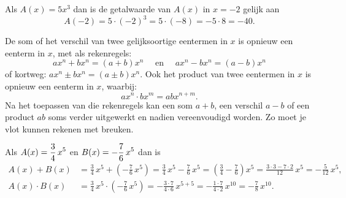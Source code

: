 \documentclass{ximera}
\begin{document}
\begin{example} 
Als $A(x) = 5x^3$ dan is de getalwaarde van $A(x)$ in $x = -2$ gelijk aan 
\[
A(-2) = 5 \cdot (-2)^3 = 5 \cdot (-8) = - 5 \cdot 8 = -40.
\]
\end{example} 

De som of het verschil van twee gelijksoortige eentermen in $x$ is opnieuw een eenterm in $x$, met als rekenregels:
\[
ax^n + bx^n = (a+b)x^n \quad \text{ en } \quad ax^n - bx^n = (a-b)x^n
\]
of kortweg: $ax^n \pm bx^n = (a\pm b)x^n$. Ook het product van twee eentermen in $x$ is opnieuw een eenterm in $x$, waarbij:
\[
ax^n \cdot bx^m = abx^{n+m}.
\]
Na het toepassen van die rekenregels kan een som $a+b$, een verschil $a-b$ of een product $ab$ soms verder uitgewerkt en nadien vereenvoudigd worden. Zo moet je vlot kunnen rekenen met breuken.

\begin{example} 
Als $\displaystyle A(x) = \frac{3}{4}\,x^5$ en $\displaystyle B(x) = -\frac{7}{6}\,x^5$ dan is 
\begin{align*}
A(x) + B(x) & = \frac{3}{4}\,x^5 + \left(-\frac{7}{6}\,x^5\right) 
= \frac{3}{4}\,x^5 - \frac{7}{6}\,x^5
= \left(\frac{3}{4} - \frac{7}{6}\right)x^5 
= \frac{3 \cdot 3 - 7 \cdot 2}{12}\,x^5 
= -\frac{5}{12}\,x^5, \\
A(x) \cdot B(x) & = \frac{3}{4}\,x^5 \cdot \left(-\frac{7}{6}\,x^5\right) = - \frac{3 \cdot 7}{4 \cdot 6}\,x^{5+5} = -\frac{1\cdot 7}{4 \cdot 2}\, x^{10} = -\frac{7}{8}\,x^{10}. 
\end{align*}
\end{example}
\end{document}
